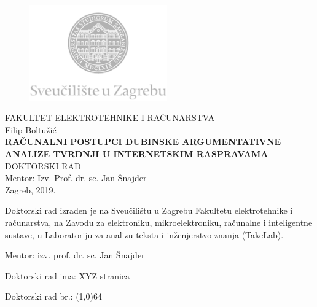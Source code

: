 \begin{titlepage}
  \fontsize{16pt}{20pt}\selectfont
  \selectfont
  \setlength{\intextsep}{0pt plus 0pt minus 0pt}

  \begin{center}
    \begin{figure}[ht!]
      \begin{center}
        \includegraphics[height=4.1184cm, width=5.94cm]{logo_unizg2}
      \end{center}
    \end{figure}		
    \vspace{0cm}
    {FAKULTET ELEKTROTEHNIKE I RAČUNARSTVA} \\
    \vspace{3cm}
    Filip Boltužić \\
    \vspace{2cm}
    {\fontsize{22pt}{22pt}\selectfont\textbf{
RAČUNALNI POSTUPCI DUBINSKE ARGUMENTATIVNE ANALIZE TVRDNJI U INTERNETSKIM RASPRAVAMA
}} \\
    \vspace{2cm}    
    DOKTORSKI RAD \\
    \vspace{5cm}    %
	Mentor: Izv. Prof. dr. sc. Jan Šnajder \\
    \vfill{Zagreb, 2019.}
  \end{center}
  \restoregeometry
\end{titlepage}


\begin{titlepage}
  \begin{minipage}{\dimexpr\textwidth-1cm}
    \vspace{3cm}
    Doktorski rad izrađen je na Sveučilištu u Zagrebu
    Fakultetu elektrotehnike i računarstva, na Zavodu za 
    elektroniku, mikroelektroniku, računalne i inteligentne sustave, u 
    Laboratoriju za analizu teksta i inženjerstvo znanja (TakeLab).

    \vspace{1cm}
    Mentor: izv. prof. dr. sc. Jan Šnajder

    \vspace{1cm}
    Doktorski rad ima: XYZ stranica

    \vspace{1cm}
    Doktorski rad br.: \line(1,0){64}
  \end{minipage}
\end{titlepage}

